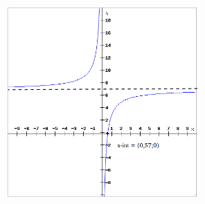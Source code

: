 {\begin{mdframed}[linewidth=4, leftmargin=40, rightmargin=40]
\begin{exercise}
\begin{enumerate}[noitemsep, label=\textbf{Step} \textbf{\arabic*}. ]
	\begin{figure}[H] %
    \begin{center}
    \label{m39341*uid12479!!!underscore!!!media}\label{m39341*uid12479!!!underscore!!!printimage}\includegraphics[width=280px]{col11306.imgs/m39341_hyperbola1.png} %
        
      \vspace{2pt}
    \vspace{.1in}
    
    \end{center}

 \end{figure}   

    \addtocounter{footnote}{-0}
    
\end{enumerate}
        


    \end{exercise}
    \end{mdframed}
    }
    \noindent
  
\label{m39341*secfhsst!!!underscore!!!id3460}
            \nopagebreak
            
